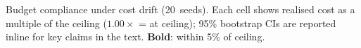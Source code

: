 Budget compliance under cost drift (20~seeds).
Each cell shows realised cost as a multiple of the ceiling ($1.00{\times}$ = at ceiling); 95\% bootstrap CIs are reported inline for key claims in the text.
\textbf{Bold}: within 5\% of ceiling.
